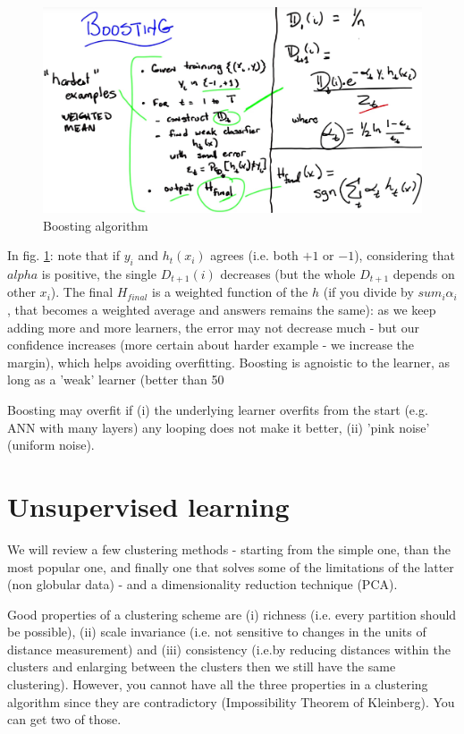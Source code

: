 \documentclass[11pt]{article}
\begin{document}
\begin{figure}[htbp] 
	\centering
	\includegraphics[width=.9\textwidth]{pics/boosting_1}
	\caption{Boosting algorithm} 
	\label{boosting_1}
\end{figure}
In fig. \ref{boosting_1}: note that if $y_i$ and $h_t(x_i)$ agrees (i.e. both $+1$ or $-1$), considering that $alpha$ is positive, the single $D_{t+1}(i)$ decreases (but the whole $D_{t+1}$ depends on other $x_i$). The final $H_{final}$ is a weighted function of the $h$ (if you divide by $sum_i \alpha_i$, that becomes a weighted average and answers remains the same): as we keep adding more and more learners, the error may not decrease much - but our confidence increases (more certain about harder example - we increase the margin), which helps avoiding overfitting. Boosting is agnoistic to the learner, as long as a 'weak' learner (better than 50%

Boosting may overfit if (i) the underlying learner overfits from the start (e.g. ANN with many layers) any looping does not make it better, (ii) 'pink noise' (uniform noise). 

\section{Unsupervised learning}
We will review a few clustering methods - starting from the simple one, than the most popular one, and finally one that solves some of the limitations of the latter (non globular data) - and a dimensionality reduction technique (PCA).

Good properties of a clustering scheme are (i) richness (i.e. every partition should be possible), (ii) scale invariance (i.e. not sensitive to changes in the units of distance measurement) and (iii) consistency (i.e.by reducing distances within the clusters and enlarging between the clusters then we still have the same clustering).
However, you cannot have all the three properties in a clustering algorithm since they are contradictory (Impossibility Theorem of Kleinberg). You can get two of those.
\end{document}
